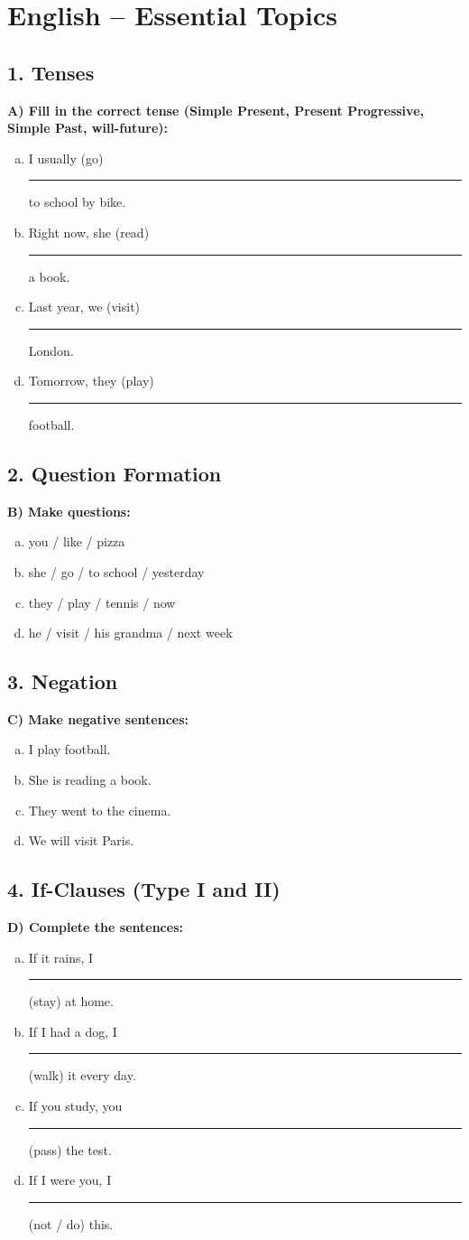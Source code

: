 
\section*{English – Essential Topics}

\subsection*{1. Tenses}
\textbf{A) Fill in the correct tense (Simple Present, Present Progressive, Simple Past, will-future):}
\begin{enumerate}[a)]
    \item I usually (go) \rule{2cm}{0.15mm} to school by bike.
    \item Right now, she (read) \rule{2cm}{0.15mm} a book.
    \item Last year, we (visit) \rule{2cm}{0.15mm} London.
    \item Tomorrow, they (play) \rule{2cm}{0.15mm} football.
\end{enumerate}

\subsection*{2. Question Formation}
\textbf{B) Make questions:}
\begin{enumerate}[a)]
    \item you / like / pizza
    \item she / go / to school / yesterday
    \item they / play / tennis / now
    \item he / visit / his grandma / next week
\end{enumerate}

\subsection*{3. Negation}
\textbf{C) Make negative sentences:}
\begin{enumerate}[a)]
    \item I play football.
    \item She is reading a book.
    \item They went to the cinema.
    \item We will visit Paris.
\end{enumerate}

\subsection*{4. If-Clauses (Type I and II)}
\textbf{D) Complete the sentences:}
\begin{enumerate}[a)]
    \item If it rains, I \rule{2cm}{0.15mm} (stay) at home.
    \item If I had a dog, I \rule{2cm}{0.15mm} (walk) it every day.
    \item If you study, you \rule{2cm}{0.15mm} (pass) the test.
    \item If I were you, I \rule{2cm}{0.15mm} (not / do) this.
\end{enumerate}

